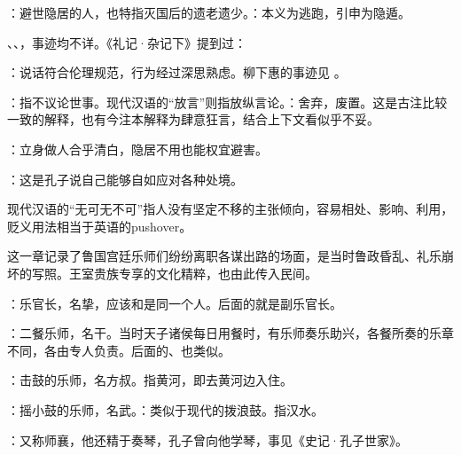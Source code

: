 {
\item {}：避世隐居的人，也特指灭国后的遗老遗少。：本义为逃跑，引申为隐遁。
\item {}、、，事迹均不详。《礼记·杂记下》提到过：
\item {}：说话符合伦理规范，行为经过深思熟虑。柳下惠的事迹见 。
\item {}：指不议论世事。现代汉语的“放言”则指放纵言论。：舍弃，废置。这是古注比较一致的解释，也有今注本解释为肆意狂言，结合上下文看似乎不妥。
\item {}：立身做人合乎清白，隐居不用也能权宜避害。
\item {}：这是孔子说自己能够自如应对各种处境。

现代汉语的“无可无不可”指人没有坚定不移的主张倾向，容易相处、影响、利用，贬义用法相当于英语的pushover。 %
}
{}


{
这一章记录了鲁国宫廷乐师们纷纷离职各谋出路的场面，是当时鲁政昏乱、礼乐崩坏的写照。王室贵族专享的文化精粹，也由此传入民间。
\begin{lyblobitemize}
\item {}：乐官长，名挚，应该和是同一个人。后面的就是副乐官长。
\item {}：二餐乐师，名干。当时天子诸侯每日用餐时，有乐师奏乐助兴，各餐所奏的乐章不同，各由专人负责。后面的、也类似。
\item {}：击鼓的乐师，名方叔。指黄河，即去黄河边入住。
\item {}：摇小鼓的乐师，名武。：类似于现代的拨浪鼓。指汉水。
\item {}：又称师襄，他还精于奏琴，孔子曾向他学琴，事见《史记·孔子世家》。
\end{lyblobitemize}
}
{}



